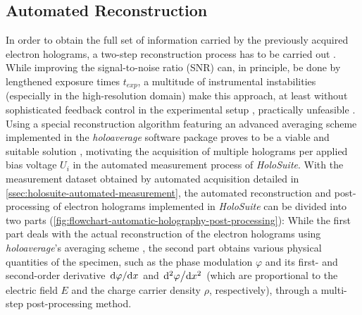 \subsection{Automated Reconstruction} \label{ssec:holosuite-automated-reconstruction}
In order to obtain the full set of information carried by the previously acquired electron
holograms, a two-step reconstruction process has to be carried out \cite{Voelkl1999,Lehmann2002,Lichte2008}. While improving the signal-to-noise ratio (SNR) can, in principle, be done by lengthened exposure times $t_{\mathit{exp}}$, a multitude of instrumental instabilities (especially in the high-resolution domain) make this approach, at least without sophisticated feedback control in the experimental setup \cite{Gatel2018,Takahashi2020}, practically unfeasible \cite{Niermann2014}. Using a special reconstruction algorithm featuring an advanced averaging scheme implemented in the \emph{holoaverage} software package proves to be a viable and suitable solution \cite{Niermann2014}, motivating the acquisition of multiple holograms per applied bias voltage $U_i$ in the automated measurement process of \emph{HoloSuite}.
\newpage
With the measurement dataset obtained by automated acquisition detailed in \cref{ssec:holosuite-automated-measurement}, the automated reconstruction and post-processing of electron holograms implemented in \emph{HoloSuite} can be divided into two parts (\cref{fig:flowchart-automatic-holography-post-processing}): While the first part deals with the actual reconstruction of the electron holograms using \emph{holoaverage}'s averaging scheme \cite{Niermann2014}, the second part obtains various physical quantities of the specimen, such as the phase modulation $\varphi$ and its first- and second-order derivative $\dv*{\varphi}{x}$ and $\dv*[2]{\varphi}{x}$ (which are proportional to the electric field $E$ and the charge carrier density $\rho$, respectively), through a multi-step post-processing method.
